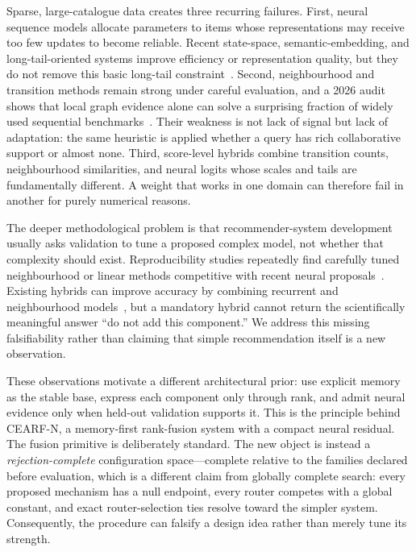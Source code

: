 \documentclass[runningheads]{llncs}
\newcommand{\method}{CEARF-N}
\begin{document}
Sparse, large-catalogue data creates three recurring failures. First, neural
sequence models allocate parameters to items whose representations may receive
too few updates to become reliable. Recent state-space, semantic-embedding,
and long-tail-oriented systems improve efficiency or representation quality,
but they do not remove this basic long-tail constraint~\cite{sigma2025,llm2rec2025,longtail2026}. Second, neighbourhood and transition methods remain
strong under careful evaluation, and a 2026 audit shows that local graph
evidence alone can solve a surprising fraction of widely used sequential
benchmarks~\cite{popstrat2025,graphshortcut2026}. Their weakness is not lack
of signal but lack of adaptation: the same heuristic is applied whether a
query has rich collaborative support or almost none. Third, score-level
hybrids combine transition counts, neighbourhood similarities, and neural
logits whose scales and tails are fundamentally different. A weight that works
in one domain can therefore fail in another for purely numerical reasons.

The deeper methodological problem is that recommender-system development
usually asks validation to tune a proposed complex model, not whether that
complexity should exist. Reproducibility studies repeatedly find carefully
tuned neighbourhood or linear methods competitive with recent neural
proposals~\cite{ferraridacrema2019progress,ludewig2021empirical}. Existing
hybrids can improve accuracy by combining recurrent and neighbourhood
models~\cite{jannach2017hybrid}, but a mandatory hybrid cannot return the
scientifically meaningful answer ``do not add this component.'' We address
this missing falsifiability rather than claiming that simple recommendation
itself is a new observation.

These observations motivate a different architectural prior: use explicit
memory as the stable base, express each component only through rank, and admit
neural evidence only when held-out validation supports it. This is the
principle behind \method{}, a memory-first rank-fusion system with a compact
neural residual. The fusion primitive is deliberately standard. The new object
is instead a \emph{rejection-complete} configuration space---complete
relative to the families declared before evaluation, which is a different
claim from globally complete search: every proposed
mechanism has a null endpoint, every router competes with a global constant,
and exact router-selection ties resolve toward the simpler system.
Consequently, the procedure can falsify a design idea rather than merely tune
its strength.
\end{document}
